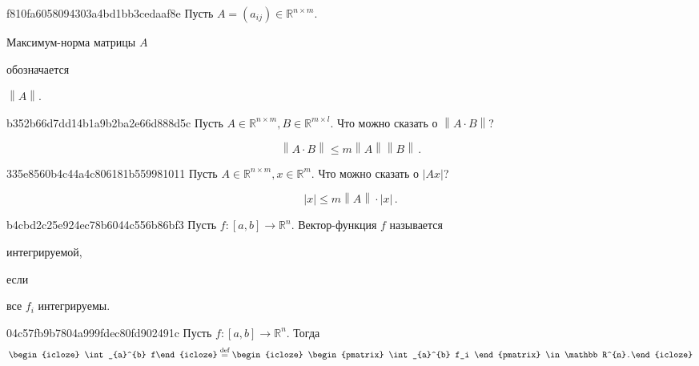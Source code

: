\begin{note}{f810fa6058094303a4bd1bb3cedaaf8e}
    Пусть \({ A = (a_{ij}) \in \mathbb R^{n \times m} }\).
    \begin{icloze}{2}Максимум-норма матрицы \({ A }\)\end{icloze} обозначается \begin{icloze}{1}\({ \left\lVert A \right\rVert }\).\end{icloze}
\end{note}

\begin{note}{b352b66d7dd14b1a9b2ba2e66d888d5c}
    Пусть \({ A \in \mathbb R^{n \times m}, B \in \mathbb R^{m \times l} }\).
    Что можно сказать о \({ \left\lVert A \cdot B \right\rVert }\)?

    \begin{cloze}{1}
        \[
            \left\lVert A \cdot B \right\rVert \leqslant m \left\lVert A \right\rVert \left\lVert B \right\rVert\,.
        \]
    \end{cloze}
\end{note}

\begin{note}{335e8560b4c44a4c806181b559981011}
    Пусть \({ A \in \mathbb R^{n \times m}, x \in \mathbb R^{m} }\).
    Что можно сказать о \({ \left\lvert Ax \right\rvert }\)?

    \begin{cloze}{1}
        \[
            \left\lvert x \right\rvert \leqslant m \left\lVert A \right\rVert \cdot \left\lvert x \right\rvert\,.
        \]
    \end{cloze}
\end{note}

\begin{note}{b4cbd2c25e924ec78b6044c556b86bf3}
    Пусть \({ f : [a, b] \to \mathbb R^{n} }\).
    Вектор-функция \({ f }\) называется \begin{icloze}{2}интегрируемой,\end{icloze} если \begin{icloze}{1}все \({ f_i }\) интегрируемы.\end{icloze}
\end{note}

\begin{note}{04c57fb9b7804a999fdec80fd902491c}
    Пусть \({ f : [a, b] \to \mathbb R^{n} }\).
    Тогда
    \[
        \begin{icloze}{2}\int_{a}^{b} f\end{icloze} \overset{\text{def}}= \begin{icloze}{1}\begin{pmatrix}
            \int_{a}^{b} f_i
        \end{pmatrix} \in \mathbb R^{n}.\end{icloze}
    \]
\end{note}

